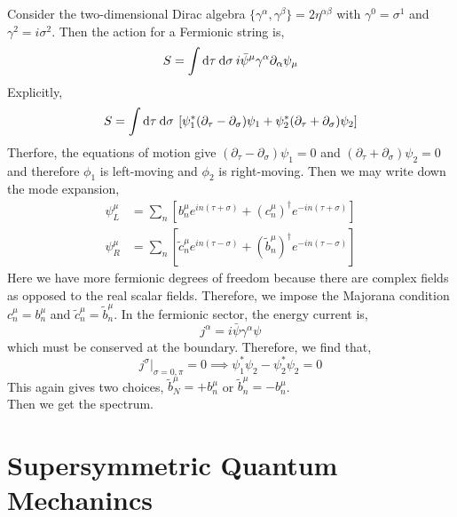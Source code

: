 \documentclass[12pt]{extarticle}
\begin{document}
Consider the two-dimensional Dirac algebra $\{ \gamma^\alpha, \gamma^\beta \} = 2 \eta^{\alpha \beta}$ with $\gamma^0 = \sigma^1$ and $\gamma^2 = i \sigma^2$. Then the action for a Fermionic string is,
\[ S = \int \mathrm{d}\tau \: \mathrm{d}\sigma \: i \bar{\psi}^\mu \gamma^\alpha \partial_\alpha \psi_\mu \] 
Explicitly,
\begin{align*}
S = \int \mathrm{d}\tau \: \mathrm{d}\sigma \: \left[ \psi_1^* (\partial_\tau - \partial_\sigma) \psi_1 + \psi_2^*(\partial_\tau + \partial_\sigma) \psi_2 \right]
\end{align*}
Therfore, the equations of motion give $(\partial_\tau - \partial_\sigma) \psi_1 = 0$ and $(\partial_\tau + \partial_\sigma) \psi_2 = 0$ and therefore $\phi_1$ is left-moving and $\phi_2$ is right-moving. Then we may write down the mode expansion,
\begin{align*}
\psi^\mu_L & = \sum_n [b^\mu_n e^{i n (\tau + \sigma)} + (c^\mu_n)^\dagger e^{- in(\tau + \sigma)}]  
\\
\psi^\mu_R & = \sum_n [\tilde{c}^\mu_n e^{i n (\tau - \sigma)} + (\tilde{b}^\mu_n)^\dagger e^{- in(\tau - \sigma)}]  
\end{align*}
Here we have more fermionic degrees of freedom because there are complex fields as opposed to the real scalar fields. Therefore, we impose the Majorana condition $c^\mu_n = b^\mu_n$ and $\tilde{c}^\mu_n = \tilde{b}_n^\mu$. In the fermionic sector, the energy current is,
\[ j^\alpha = i \bar{\psi} \gamma^\alpha \psi \]
which must be conserved at the boundary. Therefore, we find that,
\[ j^\sigma|_{\sigma = 0,\pi} = 0 \implies \psi_1^* \psi_2 - \psi_2^* \psi_2 = 0 \]
This again gives two choices, $\tilde{b}^\mu_N = + b^\mu_n$ or $\tilde{b}^\mu_n = - b^\mu_n$. 
\bigskip\\
Then we get the spectrum. 

\section{Supersymmetric Quantum Mechanincs}
\end{document}
